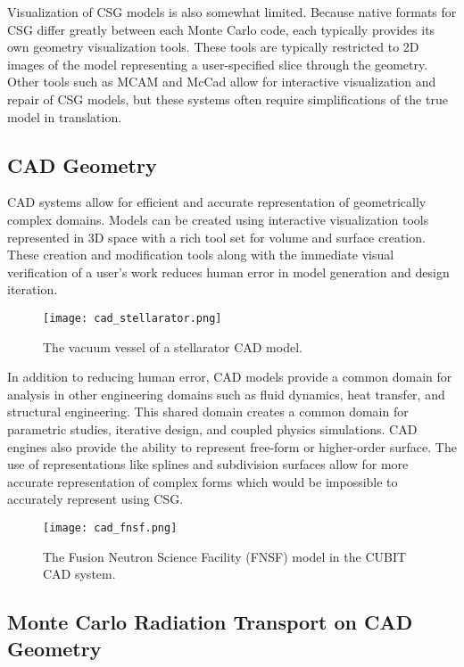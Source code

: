 Visualization of CSG models is also somewhat limited. Because native formats for
CSG differ greatly between each Monte Carlo code, each typically provides its
own geometry visualization tools. These tools are typically restricted to 2D
images of the model representing a user-specified slice through the
geometry. Other tools such as MCAM \cite{Liu_2005} and McCad
\cite{Tsigetamirat_2008} allow for interactive visualization and repair of CSG
models, but these systems often require simplifications of the true model in
translation.

\subsection{CAD Geometry}

CAD systems allow for efficient and accurate representation of geometrically
complex domains. Models can be created using interactive visualization tools
represented in 3D space with a rich tool set for volume and surface
creation. These creation and modification tools along with the immediate visual
verification of a user's work reduces human error in model generation and design
iteration.

\begin{figure}[H]
  \texttt{[image: cad\_stellarator.png]}
  \caption{The vacuum vessel of a stellarator CAD model.}
  \label{fig:cad_stellarator}
\end{figure}

In addition to reducing human error, CAD models provide a common domain for
analysis in other engineering domains such as fluid dynamics, heat transfer, and
structural engineering. This shared domain creates a common domain for
parametric studies, iterative design, and coupled physics simulations. CAD
engines also provide the ability to represent free-form or higher-order
surface. The use of representations like splines and subdivision surfaces allow
for more accurate representation of complex forms which would be impossible to
accurately represent using CSG.

\begin{figure}[h]
  \centering
  \texttt{[image: cad\_fnsf.png]}
  \caption{The Fusion Neutron Science Facility (FNSF) model in the CUBIT \cite{Blacker_1994}
    CAD system.}
  \label{fig:cad_fnsf}
\end{figure}

\subsection{Monte Carlo Radiation Transport on CAD Geometry}

